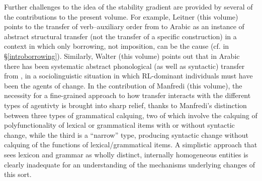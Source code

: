 \documentclass[output=paper]{langsci/langscibook}
\begin{document}
Further challenges to the idea of the stability gradient are provided by several of the contributions to the present volume. For example, Leitner (this volume) points to the transfer of verb--auxiliary order from  to  Arabic as an instance of abstract structural transfer (not the transfer of a specific construction) in a context in which only borrowing, not imposition, can be the cause (cf.  in §\ref{introborrowing}). Similarly, Walter (this volume) points out that in  Arabic there has been systematic abstract phonological (as well as syntactic) transfer from , in a sociolinguistic situation in which RL-dominant individuals must have been the agents of change. In the contribution of Manfredi (this volume), the necessity for a fine-grained approach to how transfer interacts with the different types of agentivty is brought into sharp relief, thanks to Manfredi's distinction between three types of grammatical calquing, two of which involve the calquing of polyfunctionality of lexical or grammatical items with or without syntactic change, while the third is a “narrow” type, producing syntactic change without calquing of the functions of lexical/grammatical items. A simplistic approach that sees lexicon and grammar as wholly distinct, internally homogeneous entities is clearly inadequate for an understanding of the mechanisms underlying changes of this sort.
\end{document}
